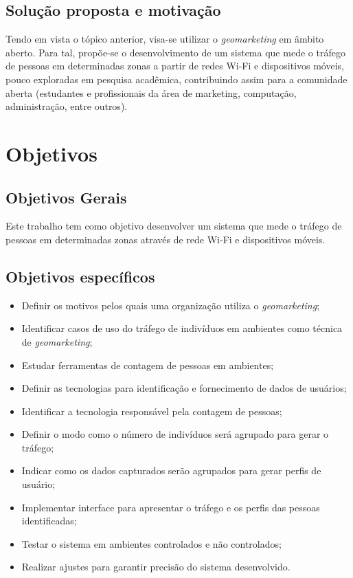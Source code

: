 \subsection{Solução proposta e motivação}
Tendo em vista o tópico anterior, visa-se utilizar o \emph{geomarketing} em 
âmbito aberto. Para tal, propõe-se o desenvolvimento de um sistema que mede o
tráfego de pessoas em determinadas zonas a partir de redes Wi-Fi e dispositivos móveis, pouco exploradas em
pesquisa acadêmica, contribuindo assim para a comunidade aberta (estudantes e profissionais da área de
marketing, computação, administração, entre outros).

\section{Objetivos}
\label{objetivos}

\subsection{Objetivos Gerais}
Este trabalho tem como objetivo desenvolver um sistema que mede o tráfego de
pessoas em determinadas zonas através de rede Wi-Fi e dispositivos móveis.

\subsection{Objetivos específicos}
\begin{itemize}
  \item Definir os motivos pelos quais uma organização utiliza o \emph{geomarketing};
  \item Identificar casos de uso do tráfego de indivíduos em ambientes como técnica
  de \emph{geomarketing};
  \item Estudar ferramentas de contagem de pessoas em ambientes;
  \item Definir as tecnologias para identificação e fornecimento de dados de usuários;
  \item Identificar a tecnologia responsável pela contagem de pessoas;
  \item Definir o modo como o número de indivíduos será agrupado para gerar o tráfego;
  \item Indicar como os dados capturados serão agrupados para gerar perfis de usuário;
  \item Implementar interface para apresentar o tráfego e os perfis das pessoas identificadas;
  \item Testar o sistema em ambientes controlados e não controlados;
  \item Realizar ajustes para garantir precisão do sistema desenvolvido.
\end{itemize}

